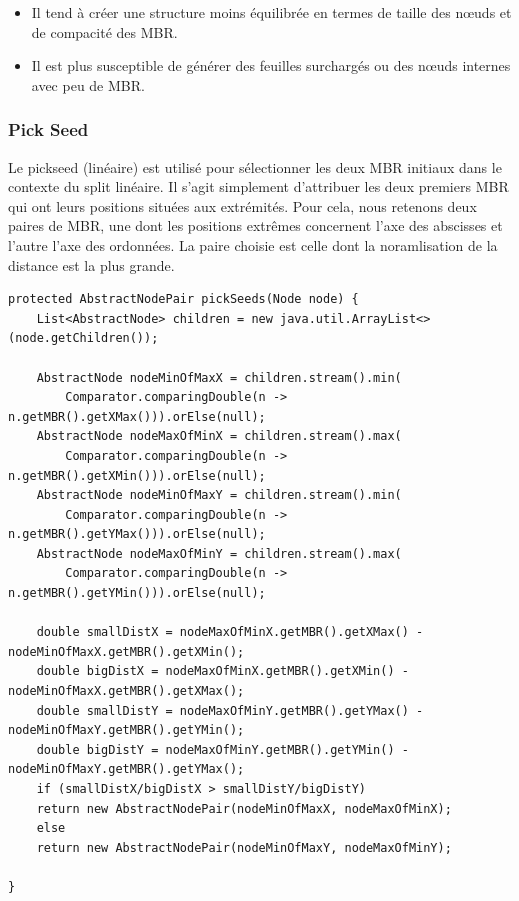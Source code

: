 \documentclass {article}
\begin{document}
\begin{itemize}
    \item Il tend à créer une structure moins équilibrée en termes de taille des nœuds et de
	compacité des MBR.
    \item Il est plus susceptible de générer des feuilles surchargés ou des nœuds internes
	avec peu de MBR.

\end{itemize}

\subsubsection {Pick Seed}

Le pickseed (linéaire) est utilisé pour sélectionner les deux MBR initiaux dans le contexte du split linéaire.
Il s'agit simplement d'attribuer les deux premiers MBR qui ont leurs positions situées aux extrémités.
Pour cela, nous retenons deux paires de MBR, une dont les positions extrêmes concernent l'axe des abscisses et
l'autre l'axe des ordonnées.
La paire choisie est celle dont la noramlisation de la distance est la plus grande.



\begin{verbatim}
protected AbstractNodePair pickSeeds(Node node) {
    List<AbstractNode> children = new java.util.ArrayList<>(node.getChildren());

    AbstractNode nodeMinOfMaxX = children.stream().min(
	    Comparator.comparingDouble(n -> n.getMBR().getXMax())).orElse(null);
    AbstractNode nodeMaxOfMinX = children.stream().max(
	    Comparator.comparingDouble(n -> n.getMBR().getXMin())).orElse(null);
    AbstractNode nodeMinOfMaxY = children.stream().min(
	    Comparator.comparingDouble(n -> n.getMBR().getYMax())).orElse(null);
    AbstractNode nodeMaxOfMinY = children.stream().max(
	    Comparator.comparingDouble(n -> n.getMBR().getYMin())).orElse(null);

    double smallDistX = nodeMaxOfMinX.getMBR().getXMax() - nodeMinOfMaxX.getMBR().getXMin();
    double bigDistX = nodeMaxOfMinX.getMBR().getXMin() - nodeMinOfMaxX.getMBR().getXMax();
    double smallDistY = nodeMaxOfMinY.getMBR().getYMax() - nodeMinOfMaxY.getMBR().getYMin();
    double bigDistY = nodeMaxOfMinY.getMBR().getYMin() - nodeMinOfMaxY.getMBR().getYMax();
    if (smallDistX/bigDistX > smallDistY/bigDistY)
	return new AbstractNodePair(nodeMinOfMaxX, nodeMaxOfMinX);
    else
	return new AbstractNodePair(nodeMinOfMaxY, nodeMaxOfMinY);

}
\end{verbatim}
\end{document}
